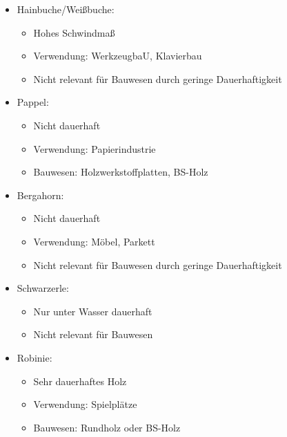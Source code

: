 \documentclass[fleqn,twoside]{article}
\begin{document}
\begin{itemize}
                \begin{itemize}
                    \item Hainbuche/Weißbuche:
                        \begin{itemize}
                            \item Hohes Schwindmaß
                            \item Verwendung: WerkzeugbaU, Klavierbau
                            \item Nicht relevant für Bauwesen durch geringe Dauerhaftigkeit
                        \end{itemize}
                    \item Pappel:
                        \begin{itemize}
                            \item Nicht dauerhaft
                            \item Verwendung: Papierindustrie
                            \item Bauwesen: Holzwerkstoffplatten, BS-Holz
                        \end{itemize}
                    \item Bergahorn:
                        \begin{itemize}
                            \item Nicht dauerhaft
                            \item Verwendung: Möbel, Parkett
                            \item Nicht relevant für Bauwesen durch geringe Dauerhaftigkeit
                        \end{itemize}
                    \item Schwarzerle:
                        \begin{itemize}
                            \item Nur unter Wasser dauerhaft
                            \item Nicht relevant für Bauwesen
                        \end{itemize}
                    \item Robinie:
                        \begin{itemize}
                            \item Sehr dauerhaftes Holz
                            \item Verwendung: Spielplätze
                            \item Bauwesen: Rundholz oder BS-Holz

\end{itemize}
\end{itemize}
\end{itemize}
\end{document}
